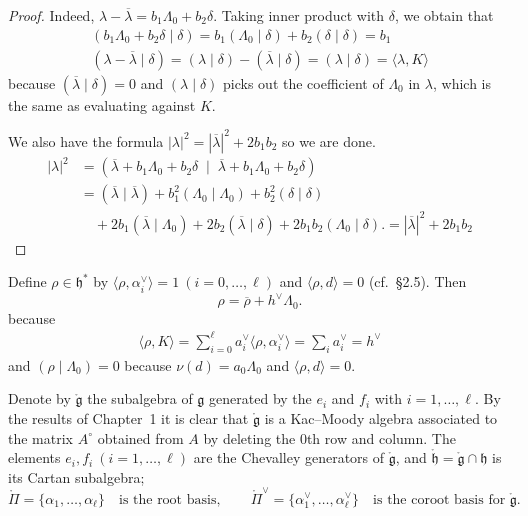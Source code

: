 \documentclass[12pt]{article}
\begin{document}
\begin{proof}
Indeed, $\lambda - \overline{\lambda} = b_1 \Lambda_0 + b_2\delta$.  
Taking inner product with $\delta$, we obtain that \begin{align*}
    (b_1 \Lambda_0 + b_2 \delta \mid \delta) = b_1 (\Lambda_0 \mid \delta) + b_2 (\delta \mid \delta) = b_1 \\
    (\lambda - \overline{\lambda} \mid \delta) = (\lambda \mid \delta) - (\overline{\lambda} \mid \delta) = (\lambda \mid \delta) = \langle \lambda, K \rangle
\end{align*} because $(\overline{\lambda} \mid \delta) = 0$ and $(\lambda \mid \delta)$ picks out the coefficient of $\Lambda_0$ in $\lambda$, which is the same as evaluating against $K$.

We also have the formula $|\lambda|^2 = |\overline{\lambda}|^2 + 2b_1 b_2$ so we are done.
\begin{align*}
|\lambda|^2 
&= (\overline{\lambda} + b_1 \Lambda_0 + b_2 \delta \;\mid\; \overline{\lambda} + b_1 \Lambda_0 + b_2 \delta) \\[6pt]
&= (\overline{\lambda}\mid \overline{\lambda})
   + b_1^2 (\Lambda_0 \mid \Lambda_0)
   + b_2^2 (\delta \mid \delta) \\[4pt]
&\quad + 2b_1 (\overline{\lambda}\mid \Lambda_0)
   + 2b_2 (\overline{\lambda}\mid \delta)
   + 2b_1 b_2 (\Lambda_0\mid \delta).
   = |\overline{\lambda}|^2 + 2b_1 b_2
\end{align*}
\end{proof}


Define $\rho \in \mathfrak{h}^*$ by $\langle \rho, \alpha_i^\vee \rangle = 1 \ (i=0,\dots,\ell)$ and $\langle \rho, d \rangle = 0$ (cf.\ §2.5).  
Then 
\begin{equation}
\rho = \overline{\rho} + h^\vee \Lambda_0.
\end{equation} because \begin{align*}
    \langle \rho, K \rangle = \sum_{i=0}^\ell a_i^\vee \langle \rho, \alpha_i^\vee \rangle = \sum_i a_i^\vee = h^\vee
\end{align*} and $(\rho \mid \Lambda_0) = 0$ because $\nu(d) = a_0 \Lambda_0$ and $\langle \rho, d \rangle = 0$.


Denote by $\mathring{\mathfrak{g}}$ the subalgebra of $\mathfrak{g}$ generated by the $e_i$ and $f_i$ with $i=1,\dots,\ell$. By the results of Chapter~1 it is clear that $\mathring{\mathfrak{g}}$ is a Kac--Moody algebra associated to the matrix $A^{\circ}$ obtained from $A$ by deleting the $0$th row and column. The elements $e_i,f_i \ (i=1,\dots,\ell)$ are the Chevalley generators of $\mathring{\mathfrak{g}}$, and $\mathring{\mathfrak{h}}=\mathring{\mathfrak{g}}\cap \mathfrak{h}$ is its Cartan subalgebra; 
\[
\mathring{\Pi}=\{\alpha_1,\dots,\alpha_\ell\} \quad\text{is the root basis}, \qquad
\mathring{\Pi}^\vee=\{\alpha_1^\vee,\dots,\alpha_\ell^\vee\}\quad\text{is the coroot basis for }\mathring{\mathfrak{g}}.
\]
\end{document}
